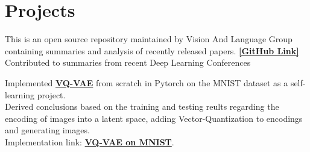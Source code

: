 \documentclass[letterpaper]{deedy-resume} %
\begin{document}
\begin{minipage}[t]{0.66\textwidth}


\section{Projects}



\textbullet{} This is an open source repository maintained by Vision And Language Group containing summaries and analysis of recently released papers. \textbf{\href{https://github.com/vlgiitr/papers_we_read}{[GitHub Link]}} \\
\textbullet{} Contributed to summaries from recent Deep Learning Conferences \\

\sectionspace %



\textbullet{} Implemented \href{https://arxiv.org/abs/1711.00937}{\bf VQ-VAE} from scratch in Pytorch on the MNIST dataset as a self-learning project. \\
\textbullet{} Derived conclusions based on the training and testing reults regarding the encoding of images into a latent space, adding Vector-Quantization to encodings and generating images. \\
\textbullet{} Implementation link: {\href{https://github.com/praeclarumjj3/VQ-VAE-on-MNIST}{\bf VQ-VAE on MNIST}}.


\end{minipage}
\end{document}
